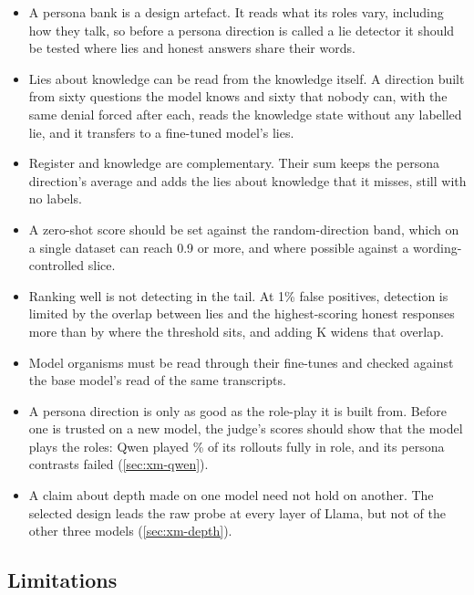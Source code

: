 \begin{itemize}[leftmargin=1.6em, itemsep=2pt]
\item A persona bank is a design artefact. It reads what its roles vary, including how they talk, so
  before a persona direction is called a lie detector it should be tested where lies and honest answers
  share their words.
\item Lies about knowledge can be read from the knowledge itself. A direction built from sixty
  questions the model knows and sixty that nobody can, with the same denial forced after each, reads
  the knowledge state without any labelled lie, and it transfers to a fine-tuned model's lies.
\item Register and knowledge are complementary. Their sum keeps the persona direction's average and
  adds the lies about knowledge that it misses, still with no labels.
\item A zero-shot score should be set against the random-direction band, which on a single dataset can
  reach 0.9 or more, and where possible against a wording-controlled slice.
\item Ranking well is not detecting in the tail. At 1\% false positives, detection is limited by the
  overlap between lies and the highest-scoring honest responses more than by where the threshold sits,
  and adding K widens that overlap.
\item Model organisms must be read through their fine-tunes and checked against the base model's read
  of the same transcripts.
\item A persona direction is only as good as the role-play it is built from. Before one is trusted on a
  new model, the judge's scores should show that the model plays the roles: Qwen played
  \% of its rollouts fully in role, and its persona contrasts failed
  (\cref{sec:xm-qwen}).
\item A claim about depth made on one model need not hold on another. The selected design leads the raw
  probe at every layer of Llama, but not of the other three models (\cref{sec:xm-depth}).
\end{itemize}

\subsection{Limitations}
\label{sec:limitations}

